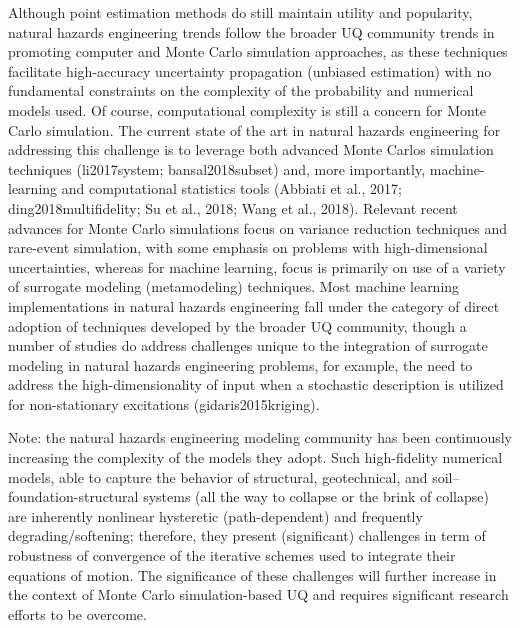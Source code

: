 Although point estimation methods do still maintain utility and popularity, natural hazards engineering trends follow the broader UQ community trends in promoting computer and Monte Carlo simulation approaches, as these techniques facilitate high-accuracy uncertainty propagation (unbiased estimation) with no fundamental constraints on the complexity of the probability and numerical models used. Of course, computational complexity is still a concern for Monte Carlo simulation. The current state of the art in natural hazards engineering for addressing this challenge is to leverage both advanced Monte Carlos simulation techniques (li2017system; bansal2018subset) and, more importantly, machine-learning and computational statistics tools (Abbiati et al., 2017; ding2018multifidelity; Su et al., 2018; Wang et al., 2018). Relevant recent advances for Monte Carlo simulations focus on variance reduction techniques and rare-event simulation, with some emphasis on problems with high-dimensional uncertainties, whereas for machine learning, focus is primarily on use of a variety of surrogate modeling (metamodeling) techniques. Most machine learning implementations in natural hazards engineering fall under the category of direct adoption of techniques developed by the broader UQ community, though a number of studies do address challenges unique to the integration of surrogate modeling in natural hazards engineering problems, for example, the need to address the high-dimensionality of input when a stochastic description is utilized for non-stationary excitations (gidaris2015kriging).

Note: the natural hazards engineering modeling community has been continuously increasing the complexity of the models they adopt. Such high-fidelity numerical models, able to capture the behavior of structural, geotechnical, and soil–foundation-structural systems (all the way to collapse or the brink of collapse) are inherently nonlinear hysteretic (path-dependent) and frequently degrading/softening; therefore, they present (significant) challenges in term of robustness of convergence of the iterative schemes used to integrate their equations of motion. The significance of these challenges will further increase in the context of Monte Carlo simulation-based UQ and requires significant research efforts to be overcome.

